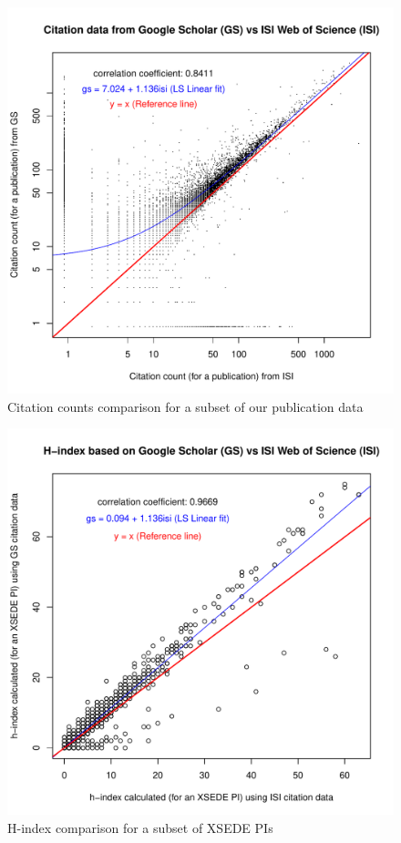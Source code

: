 \documentclass{sig-alternate}
\begin{document}
\begin{figure}[!htb] 
  \centering 
    \includegraphics[width=1.0\columnwidth]{images/11_gs_vs_isi_cites.pdf} 
  \caption{Citation counts comparison for a subset of our publication data}\label{F:gs-vs-isi-cites} 
\end{figure} 
 
\begin{figure}[!htb] 
  \centering 
    \includegraphics[width=1.0\columnwidth]{images/11_gs_vs_isi_hindex.pdf} 
  \caption{H-index comparison for a subset of XSEDE PIs}\label{F:gs-vs-isi-hindex} 
\end{figure} 
 
\end{document}
